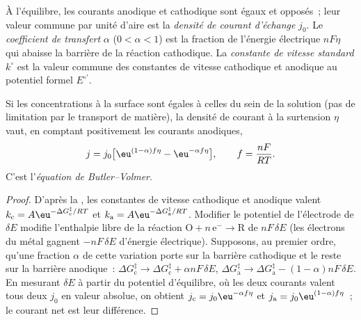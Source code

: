 \begin{definition}\label{def:b3:electrode-kinetics:exchange}
À l'équilibre, les courants anodique et cathodique sont égaux et
opposés~; leur valeur commune par unité d'aire est la \emph{densité de
courant d'échange} $j_0$. Le \emph{coefficient de transfert}
 $\alpha$ ($0 < \alpha < 1$) est la
fraction de l'énergie électrique $nF\eta$ qui abaisse la barrière de la
réaction cathodique. La
\emph{constante de vitesse standard} $k^\circ$ est la
valeur commune des constantes de vitesse cathodique et anodique au
potentiel formel $E^{\circ\prime}$.
\end{definition}

\begin{theorem}\label{thm:b3:electrode-kinetics:butler-volmer}
Si les concentrations à la surface sont égales à celles du sein de la
solution (pas de limitation par le transport de matière), la densité de
courant à la surtension $\eta$ vaut, en comptant positivement les
courants anodiques,
\[
  j = j_0\bigl[\eu^{(1 - \alpha)f\eta} - \eu^{-\alpha f\eta}\bigr], \qquad f = \frac{nF}{RT}.
\]
C'est l'\emph{équation de Butler--Volmer}.
\end{theorem}

\begin{proof}
D'après la , les constantes de vitesse
cathodique et anodique valent
$k_{\mathrm c} = A\eu^{-\Delta G_{\mathrm c}^{\ddagger}/RT}$ et
$k_{\mathrm a} = A\eu^{-\Delta G_{\mathrm a}^{\ddagger}/RT}$. Modifier le
potentiel de l'électrode de $\delta E$
modifie l'enthalpie libre de la réaction $\mathrm{O} + n\,\mathrm{e}^- \to \mathrm{R}$
de $nF\,\delta E$ (les électrons
du métal gagnent $-nF\,\delta E$ d'énergie électrique). Supposons, au
premier ordre, qu'une
fraction $\alpha$ de cette variation porte sur la barrière cathodique et
le reste sur la barrière anodique~: $\Delta G_{\mathrm c}^{\ddagger} \to \Delta G_{\mathrm c}^{\ddagger} + \alpha nF\,\delta E$, $\Delta G_{\mathrm a}^{\ddagger} \to \Delta G_{\mathrm a}^{\ddagger} - (1 - \alpha)nF\,\delta E$.
En mesurant $\delta E$
à partir du potentiel d'équilibre, où les deux courants valent tous deux
$j_0$ en valeur absolue, on obtient $j_{\mathrm c} = j_0\eu^{-\alpha f\eta}$ et $j_{\mathrm a} = j_0\eu^{(1 - \alpha)f\eta}$~;
le courant net est leur différence.
\end{proof}

